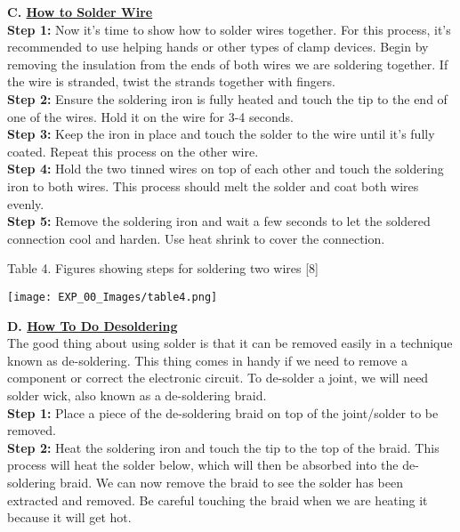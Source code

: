 \documentclass[12pt,a4paper]{article}
\begin{document}
\begin{justify}
\noindent \textbf{C. \underline{How to Solder Wire}}\\[6pt]
\textbf{Step 1:} Now it's time to show how to solder wires together. For this process, it's recommended to use helping hands or other types of clamp devices. Begin by removing the insulation from the ends of both wires we are soldering together. If the wire is stranded, twist the strands together with fingers.\\
\textbf{Step 2:} Ensure the soldering iron is fully heated and touch the tip to the end of one of the wires. Hold it on the wire for 3-4 seconds.\\
\textbf{Step 3:} Keep the iron in place and touch the solder to the wire until it's fully coated. Repeat this process on the other wire.\\
\textbf{Step 4:} Hold the two tinned wires on top of each other and touch the soldering iron to both wires. This process should melt the solder and coat both wires evenly.\\
\textbf{Step 5:}  Remove the soldering iron and wait a few seconds to let the soldered connection cool and harden. Use heat shrink to cover the connection.

\vspace{20mm}

\begin{center} {Table 4. Figures showing steps for soldering two wires [8]} \end{center}
\vspace{-8mm}
\begin{center} 
\texttt{[image: EXP\_00\_Images/table4.png]}
\end{center}



\noindent \textbf{D. \underline{How To Do Desoldering}}\\[6pt]
 The good thing about using solder is that it can be removed easily in a technique known as de-soldering. This thing comes in handy if we need to remove a component or correct the electronic circuit. To de-solder a joint, we will need solder wick, also known as a de-soldering braid.\\[6pt]
\textbf{Step 1:} Place a piece of the de-soldering braid on top of the joint/solder to be removed.\\
\textbf{Step 2:} Heat the soldering iron and touch the tip to the top of the braid. This process will heat the solder below, which will then be absorbed into the de-soldering braid. We can now remove the braid to see the solder has been extracted and removed. Be careful touching the braid when we are heating it because it will get hot.\\


\end{justify}
\end{document}
